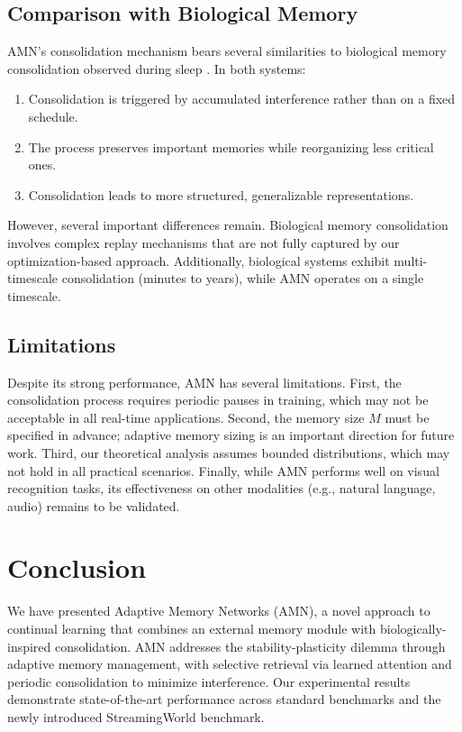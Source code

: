 \documentclass[11pt]{article}
\begin{document}
\subsection{Comparison with Biological Memory}

AMN's consolidation mechanism bears several similarities to biological memory consolidation observed during sleep \citep{walker2017sleep}. In both systems:
\begin{enumerate}
    \item Consolidation is triggered by accumulated interference rather than on a fixed schedule.
    \item The process preserves important memories while reorganizing less critical ones.
    \item Consolidation leads to more structured, generalizable representations.
\end{enumerate}

However, several important differences remain. Biological memory consolidation involves complex replay mechanisms that are not fully captured by our optimization-based approach. Additionally, biological systems exhibit multi-timescale consolidation (minutes to years), while AMN operates on a single timescale.

\subsection{Limitations}

Despite its strong performance, AMN has several limitations. First, the consolidation process requires periodic pauses in training, which may not be acceptable in all real-time applications. Second, the memory size $M$ must be specified in advance; adaptive memory sizing is an important direction for future work. Third, our theoretical analysis assumes bounded distributions, which may not hold in all practical scenarios. Finally, while AMN performs well on visual recognition tasks, its effectiveness on other modalities (e.g., natural language, audio) remains to be validated.

\section{Conclusion}
\label{sec:conclusion}

We have presented Adaptive Memory Networks (AMN), a novel approach to continual learning that combines an external memory module with biologically-inspired consolidation. AMN addresses the stability-plasticity dilemma through adaptive memory management, with selective retrieval via learned attention and periodic consolidation to minimize interference. Our experimental results demonstrate state-of-the-art performance across standard benchmarks and the newly introduced StreamingWorld benchmark.
\end{document}
